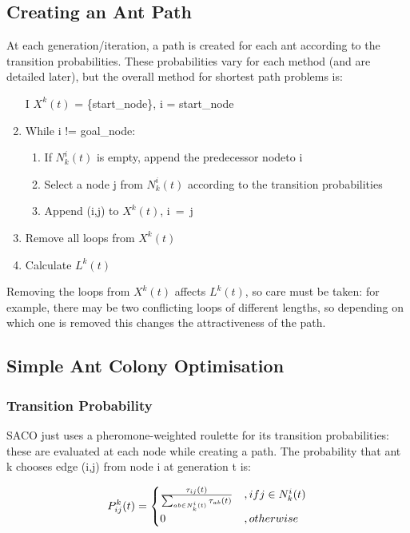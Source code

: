 \subsection{Creating an Ant Path}
At each generation/iteration, a path is created for each ant according to the transition probabilities. These probabilities vary for each method (and are detailed later), but the overall method for shortest path problems is:\\
\begin{enumerate}
    \item [I] $X^k(t)$ = \{start\_node\}, i = start\_node
    \item While i != goal\_node:
    \begin{enumerate}
        \item If $N^i_k(t)$ is empty, append the predecessor nodeto i
        \item Select a node j from $N^i_k(t)$ according to the transition probabilities
        \item Append (i,j) to $X^k(t)$, i \,=  \,j
    \end{enumerate}
    \item Remove all loops from $X^k(t)$
    \item Calculate $L^k(t)$
\end{enumerate}
Removing the loops from $X^k(t)$ affects $L^k(t)$, so care must be taken: for example, there may be two conflicting loops of different lengths, so depending on which one is removed this changes the attractiveness of the path. 

\subsection{Simple Ant Colony Optimisation}

\subsubsection{Transition Probability}
SACO just uses a pheromone-weighted roulette for its transition probabilities: these are evaluated at each node while creating a path. The probability that ant k chooses edge (i,j) from node i at generation t is:

\begin{equation}
    P_{ij}^k(t) = 
    \begin{cases}
         $$ \frac{\tau_{ij}(t)}{\sum_{ab \in N^i_k(t)} \tau_{ab}(t)} $$ &, if $$ j \in N^i_k(t) $$ \\
        0 &, otherwise
    \end{cases}
\end{equation}

